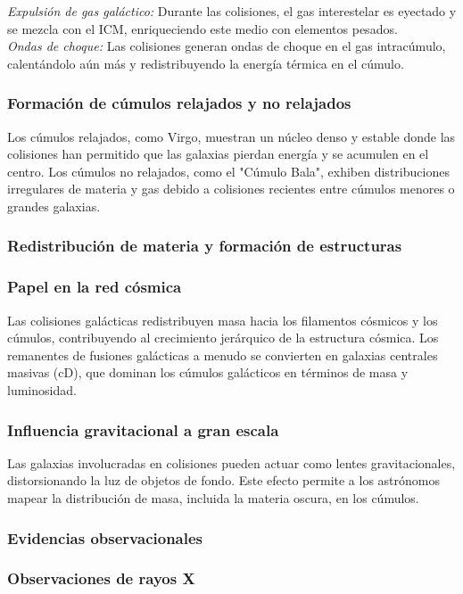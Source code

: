 \documentclass{article}
\begin{document}
\noindent \textit{Expulsión de gas galáctico:}
Durante las colisiones, el gas interestelar es eyectado y se mezcla con el ICM, enriqueciendo este medio con elementos pesados. \\
\textit{Ondas de choque:}
Las colisiones generan ondas de choque en el gas intracúmulo, calentándolo aún más y redistribuyendo la energía térmica en el cúmulo.
\subsubsection*{Formación de cúmulos relajados y no relajados}

Los cúmulos relajados, como Virgo, muestran un núcleo denso y estable donde las colisiones han permitido que las galaxias pierdan energía y se acumulen en el centro.
Los cúmulos no relajados, como el "Cúmulo Bala", exhiben distribuciones irregulares de materia y gas debido a colisiones recientes entre cúmulos menores o grandes galaxias.
\subsubsection{Redistribución de materia y formación de estructuras}
\subsubsection*{Papel en la red cósmica}

Las colisiones galácticas redistribuyen masa hacia los filamentos cósmicos y los cúmulos, contribuyendo al crecimiento jerárquico de la estructura cósmica.
Los remanentes de fusiones galácticas a menudo se convierten en galaxias centrales masivas (cD), que dominan los cúmulos galácticos en términos de masa y luminosidad.
\subsubsection*{Influencia gravitacional a gran escala}
Las galaxias involucradas en colisiones pueden actuar como lentes gravitacionales, distorsionando la luz de objetos de fondo. Este efecto permite a los astrónomos mapear la distribución de masa, incluida la materia oscura, en los cúmulos.

\subsubsection{Evidencias observacionales}
\subsubsection*{Observaciones de rayos X}
\end{document}
